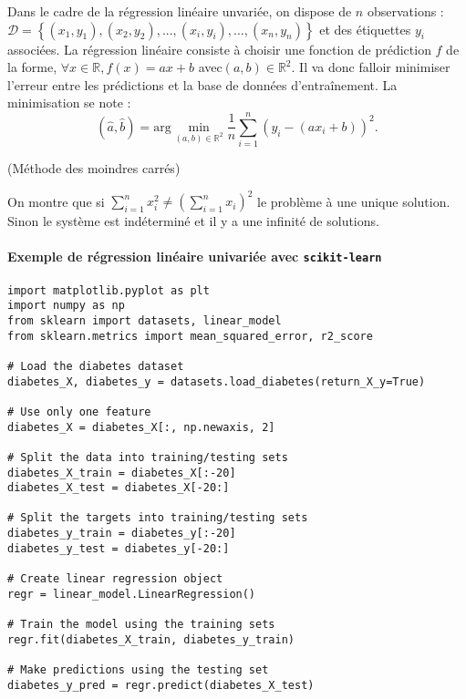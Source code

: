 {Dans le cadre de la régression linéaire unvariée, on dispose de $n$ observations : $\mathcal{D}=\left\{ \left(x_1,y_1 \right), \left(x_2,y_2 \right), ..., \left(x_i,y_i \right), ..., \left(x_n,y_n \right)\right\}$ et des étiquettes $y_i$ associées. 
La régression linéaire consiste à choisir une fonction de prédiction $f$ de la forme, $\forall x \in \mathbb{R}, f(x)=ax+b$ avec$\left(a,b\right) \in \mathbb{R}^2$. Il va donc falloir minimiser l'erreur entre les prédictions et la base de données d’entraînement. La minimisation se note : 
$$ \left(\hat{a},\hat{b}\right)= \text{arg} \min\limits_{\left(a,b\right) \in \mathbb{R}^2} \dfrac{1}{n}\sum\limits_{i=1}^{n}\left( y_i - \left(ax_i +b\right) \right)^2.$$

(Méthode des moindres carrés)

On montre que si $\sum\limits_{i=1}^{n}x_i^2 \neq \left(\sum\limits_{i=1}^{n}x_i\right)^2 $ le problème à une unique solution. Sinon le système est indéterminé et il y a une infinité de solutions.







\paragraph*{Exemple de régression linéaire univariée avec \texttt{scikit-learn}}
\begin{lstlisting}
import matplotlib.pyplot as plt
import numpy as np
from sklearn import datasets, linear_model
from sklearn.metrics import mean_squared_error, r2_score

# Load the diabetes dataset
diabetes_X, diabetes_y = datasets.load_diabetes(return_X_y=True)

# Use only one feature
diabetes_X = diabetes_X[:, np.newaxis, 2]

# Split the data into training/testing sets
diabetes_X_train = diabetes_X[:-20]
diabetes_X_test = diabetes_X[-20:]

# Split the targets into training/testing sets
diabetes_y_train = diabetes_y[:-20]
diabetes_y_test = diabetes_y[-20:]

# Create linear regression object
regr = linear_model.LinearRegression()

# Train the model using the training sets
regr.fit(diabetes_X_train, diabetes_y_train)

# Make predictions using the testing set
diabetes_y_pred = regr.predict(diabetes_X_test)


\end{lstlisting}}
